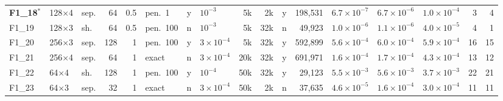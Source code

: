 \begin{table}[!htb]
\begin{tabular}{@{}lllrrlclrrcrlllrr@{}}
\textbf{F1\_18}$^{\ast}$ & 128$\times$4 & sep. & 64 & 0.5 & pen.\ 1 & y & $10^{-3}$ & 5k & 2k & y & 198{,}531 & $6.7{\times}10^{-7}$ & $6.7{\times}10^{-6}$ & $1.0{\times}10^{-4}$ & 3 & 4 \\
F1\_19 & 128$\times$3 & sh. & 64 & 0.5 & pen.\ 100 & n & $10^{-3}$ & 5k & 32k & n & 49{,}923 & $1.0{\times}10^{-6}$ & $1.1{\times}10^{-6}$ & $4.0{\times}10^{-5}$ & 4 & 1 \\
F1\_20 & 256$\times$3 & sep. & 128 & 1 & pen.\ 100 & y & $3{\times}10^{-4}$ & 5k & 32k & y & 592{,}899 & $5.6{\times}10^{-4}$ & $6.0{\times}10^{-4}$ & $5.9{\times}10^{-4}$ & 16 & 15 \\
F1\_21 & 256$\times$4 & sep. & 64 & 1 & exact & n & $3{\times}10^{-4}$ & 20k & 32k & y & 691{,}971 & $1.6{\times}10^{-4}$ & $1.7{\times}10^{-4}$ & $4.3{\times}10^{-4}$ & 13 & 12 \\
F1\_22 & 64$\times$4 & sh. & 128 & 1 & pen.\ 100 & y & $10^{-4}$ & 50k & 32k & y & 29{,}123 & $5.5{\times}10^{-3}$ & $5.6{\times}10^{-3}$ & $3.7{\times}10^{-3}$ & 22 & 21 \\
F1\_23 & 64$\times$3 & sep. & 32 & 1 & exact & n & $3{\times}10^{-4}$ & 50k & 2k & n & 37{,}635 & $4.6{\times}10^{-5}$ & $1.6{\times}10^{-4}$ & $3.0{\times}10^{-4}$ & 11 & 11 \\
\bottomrule
\end{tabular}
\end{table}

